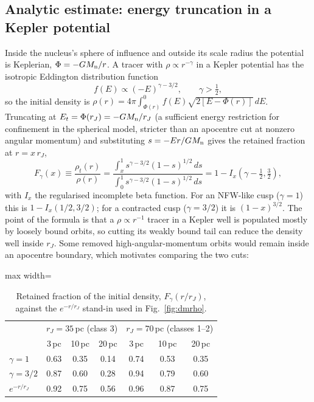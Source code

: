 \documentclass[11pt,a4paper]{article}
\begin{document}
\subsection{Analytic estimate: energy truncation in a Kepler potential}
Inside the nucleus's sphere of influence and outside its scale radius the potential is Keplerian, $\Phi=-GM_{\rm n}/r$. A tracer with $\rho\propto r^{-\gamma}$ in a Kepler potential has the isotropic Eddington distribution function
\begin{equation}
f(E)\propto(-E)^{\gamma-3/2},\qquad \gamma>\tfrac12,
\end{equation}
so the initial density is $\rho(r)=4\pi\int_{\Phi(r)}^{0}f(E)\sqrt{2[E-\Phi(r)]}\,dE$. Truncating at $E_t=\Phi(r_J)=-GM_{\rm n}/r_J$ (a sufficient energy restriction for confinement in the spherical model, stricter than
an apocentre cut at nonzero angular momentum) and substituting $s=-Er/GM_{\rm n}$ gives the retained fraction at $r=x\,r_J$,
\begin{equation}
F_\gamma(x)\equiv\frac{\rho_t(r)}{\rho(r)}
=\frac{\int_x^1 s^{\gamma-3/2}(1-s)^{1/2}\,ds}{\int_0^1 s^{\gamma-3/2}(1-s)^{1/2}\,ds}
=1-I_x\!\left(\gamma-\tfrac12,\tfrac32\right),
\end{equation}
with $I_x$ the regularised incomplete beta function. For an NFW-like cusp ($\gamma=1$) this is $1-I_x(1/2,3/2)$; for a contracted cusp ($\gamma=3/2$) it is $(1-x)^{3/2}$. The point of the formula is that a $\rho\propto r^{-1}$ tracer in a Kepler well is populated mostly by loosely bound orbits, so cutting its weakly bound tail can reduce the density well inside $r_J$. Some removed
high-angular-momentum orbits would remain inside an apocentre boundary, which motivates
comparing the two cuts:

\begin{table}[h]\centering
\caption{Retained fraction of the initial density, $F_\gamma(r/r_J)$, against the $e^{-r/r_J}$ stand-in used in Fig.~\ref{fig:dmrho}.}
\begin{adjustbox}{max width=\linewidth}
\begin{tabular}{lccc|ccc}\toprule
& \multicolumn{3}{c|}{$r_J=35$\,pc (class 3)} & \multicolumn{3}{c}{$r_J=70$\,pc (classes 1--2)}\\
& 3\,pc & 10\,pc & 20\,pc & 3\,pc & 10\,pc & 20\,pc\\\midrule
$\gamma=1$ & 0.63 & 0.35 & 0.14 & 0.74 & 0.53 & 0.35\\
$\gamma=3/2$ & 0.87 & 0.60 & 0.28 & 0.94 & 0.79 & 0.60\\
$e^{-r/r_J}$ & 0.92 & 0.75 & 0.56 & 0.96 & 0.87 & 0.75\\
\bottomrule\end{tabular}
\end{adjustbox}
\end{table}
\end{document}
